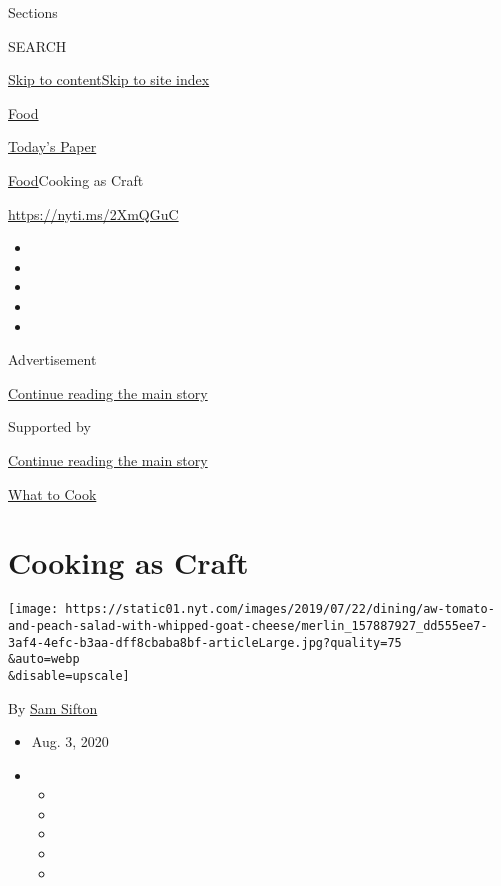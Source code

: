 Sections

SEARCH

\protect\hyperlink{site-content}{Skip to
content}\protect\hyperlink{site-index}{Skip to site index}

\href{https://www.nytimes.com/section/food}{Food}

\href{https://myaccount.nytimes.com/auth/login?response_type=cookie\&client_id=vi}{}

\href{https://www.nytimes.com/section/todayspaper}{Today's Paper}

\href{/section/food}{Food}\textbar{}Cooking as Craft

\url{https://nyti.ms/2XmQGuC}

\begin{itemize}
\item
\item
\item
\item
\item
\end{itemize}

Advertisement

\protect\hyperlink{after-top}{Continue reading the main story}

Supported by

\protect\hyperlink{after-sponsor}{Continue reading the main story}

\href{/column/what-to-cook}{What to Cook}

\hypertarget{cooking-as-craft}{%
\section{Cooking as Craft}\label{cooking-as-craft}}

\texttt{[image: https://static01.nyt.com/images/2019/07/22/dining/aw-tomato-and-peach-salad-with-whipped-goat-cheese/merlin\_157887927\_dd555ee7-3af4-4efc-b3aa-dff8cbaba8bf-articleLarge.jpg?quality=75\\\&auto=webp\\\&disable=upscale]}

By \href{https://www.nytimes.com/by/sam-sifton}{Sam Sifton}

\begin{itemize}
\item
  Aug. 3, 2020
\item
  \begin{itemize}
  \item
  \item
  \item
  \item
  \item
  \end{itemize}
\end{itemize}

